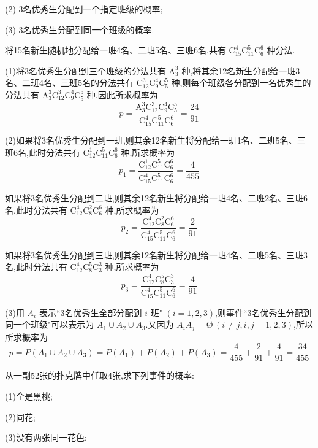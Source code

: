 (2) 3名优秀生分配到一个指定班级的概率;

(3) 3名优秀生分配到同一个班级的概率.

\begin{solution}
    将15名新生随机地分配给一班4名、二班5名、三班6名,共有 $\mathrm{C}_{15}^4 \mathrm{C}_{11}^5 \mathrm{C}_6^6$ 种分法.

    (1)将3名优秀生分配到三个班级的分法共有 $\mathrm{A}_3^3$ 种,将其余12名新生分配给一班3名、二班4名、三班5名的分法共有 $\mathrm{C}_{12}^3 \mathrm{C}_9^4 \mathrm{C}_5^5$ 种,则每个班级各分配到一名优秀生的分法共有 $\mathrm{A}_3^3 \mathrm{C}_{12}^3 \mathrm{C}_9^4 \mathrm{C}_5^5$ 种.因此所求概率为
    $$
    p = \dfrac{\mathrm{A}_3^3 \mathrm{C}_{12}^3 \mathrm{C}_9^4 \mathrm{C}_5^5}{\mathrm{C}_{15}^4 \mathrm{C}_{11}^5 \mathrm{C}_6^6} = \dfrac{24}{91}
    $$

    (2)如果将3名优秀生分配到一班,则其余12名新生将分配给一班1名、二班5名、三班6名,此时分法共有 $\mathrm{C}_{12}^1 \mathrm{C}_{11}^5 \mathrm{C}_6^6$ 种,所求概率为
    $$
    p_1 = \dfrac{\mathrm{C}_{12}^1 \mathrm{C}_{11}^5 \mathrm{C}_6^6}{\mathrm{C}_{15}^4 \mathrm{C}_{11}^5 \mathrm{C}_6^6} = \dfrac{4}{455}
    $$

    如果将3名优秀生分配到二班,则其余12名新生将分配给一班4名、二班2名、三班6名,此时分法共有 $\mathrm{C}_{12}^4 \mathrm{C}_{8}^2 \mathrm{C}_6^6$ 种,所求概率为
    $$
    p_2 = \dfrac{\mathrm{C}_{12}^4 \mathrm{C}_{8}^2 \mathrm{C}_6^6}{\mathrm{C}_{15}^4 \mathrm{C}_{11}^5 \mathrm{C}_6^6} = \dfrac{2}{91}
    $$

    如果将3名优秀生分配到三班,则其余12名新生将分配给一班4名、二班5名、三班3名,此时分法共有 $\mathrm{C}_{12}^4 \mathrm{C}_{8}^5 \mathrm{C}_3^3$ 种,所求概率为
    $$
    p_3 = \dfrac{\mathrm{C}_{12}^4 \mathrm{C}_{8}^5 \mathrm{C}_3^3}{\mathrm{C}_{15}^4 \mathrm{C}_{11}^5 \mathrm{C}_6^6} = \dfrac{4}{91}
    $$

    (3)用 $A_i$ 表示``3名优秀生全部分配到 $i$ 班" $(i=1,2,3)$,则事件``3名优秀生分配到同一个班级"可以表示为 $A_1 \cup A_2 \cup A_3$.又因为 $A_i A_j = \text{\O} \, (i \not= j, i,j=1,2,3)$,所以所求概率为
    $$
    p = P(A_1 \cup A_2 \cup A_3) = P(A_1) + P(A_2) + P(A_3) = \dfrac{4}{455} + \dfrac{2}{91} + \dfrac{4}{91} = \dfrac{34}{455}
    $$
\end{solution}

\question 从一副52张的扑克牌中任取4张,求下列事件的概率:

(1)全是黑桃;

(2)同花;

(3)没有两张同一花色;

